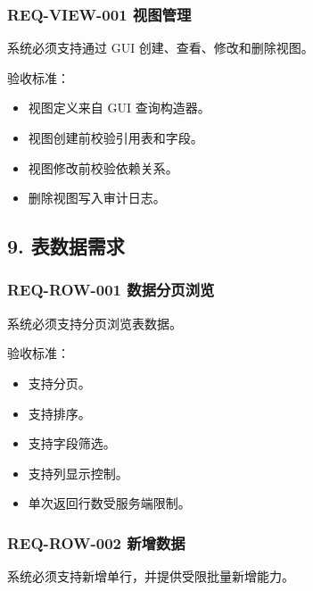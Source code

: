 \documentclass[
  a4paper,
  UTF8]{ctexart}
\providecommand{\tightlist}{%
  \setlength{\itemsep}{0pt}\setlength{\parskip}{0pt}}
\begin{document}
\hypertarget{req-view-001-ux89c6ux56feux7ba1ux7406}{%
\subsubsection{REQ-VIEW-001
视图管理}\label{req-view-001-ux89c6ux56feux7ba1ux7406}}

系统必须支持通过 GUI 创建、查看、修改和删除视图。

验收标准：

\begin{itemize}
\tightlist
\item
  视图定义来自 GUI 查询构造器。
\item
  视图创建前校验引用表和字段。
\item
  视图修改前校验依赖关系。
\item
  删除视图写入审计日志。
\end{itemize}

\hypertarget{ux8868ux6570ux636eux9700ux6c42}{%
\subsection{9. 表数据需求}\label{ux8868ux6570ux636eux9700ux6c42}}

\hypertarget{req-row-001-ux6570ux636eux5206ux9875ux6d4fux89c8}{%
\subsubsection{REQ-ROW-001
数据分页浏览}\label{req-row-001-ux6570ux636eux5206ux9875ux6d4fux89c8}}

系统必须支持分页浏览表数据。

验收标准：

\begin{itemize}
\tightlist
\item
  支持分页。
\item
  支持排序。
\item
  支持字段筛选。
\item
  支持列显示控制。
\item
  单次返回行数受服务端限制。
\end{itemize}

\hypertarget{req-row-002-ux65b0ux589eux6570ux636e}{%
\subsubsection{REQ-ROW-002
新增数据}\label{req-row-002-ux65b0ux589eux6570ux636e}}

系统必须支持新增单行，并提供受限批量新增能力。
\end{document}

